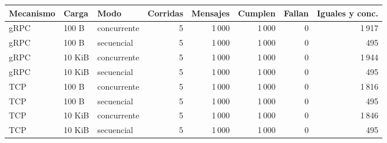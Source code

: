 \begin{tabular}{lllrrrrr}
\toprule
Mecanismo & Carga & Modo & Corridas & Mensajes & Cumplen & Fallan & Iguales y conc. \\
\midrule
gRPC & 100 B & concurrente & 5 & 1\,000 & 1\,000 & 0 & 1\,917 \\
gRPC & 100 B & secuencial & 5 & 1\,000 & 1\,000 & 0 & 495 \\
gRPC & 10 KiB & concurrente & 5 & 1\,000 & 1\,000 & 0 & 1\,944 \\
gRPC & 10 KiB & secuencial & 5 & 1\,000 & 1\,000 & 0 & 495 \\
TCP & 100 B & concurrente & 5 & 1\,000 & 1\,000 & 0 & 1\,816 \\
TCP & 100 B & secuencial & 5 & 1\,000 & 1\,000 & 0 & 495 \\
TCP & 10 KiB & concurrente & 5 & 1\,000 & 1\,000 & 0 & 1\,846 \\
TCP & 10 KiB & secuencial & 5 & 1\,000 & 1\,000 & 0 & 495 \\
\bottomrule
\end{tabular}
